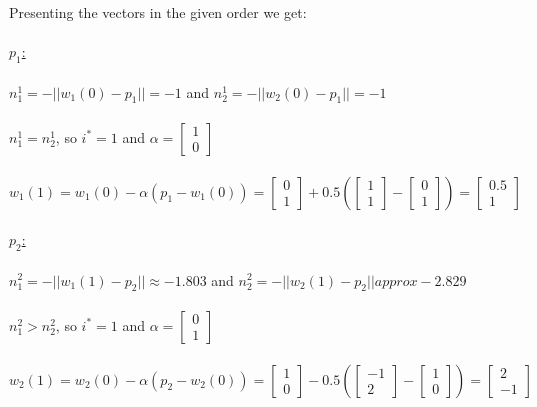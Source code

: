 \documentclass{article}
\begin{document}
\noindent Presenting the vectors in the given order we get: \\\\ \underline{$p_1$:} \\\\$n_1^1 = -||w_1(0)-p_1|| = -1$ and $n_2^1 = -||w_2(0)-p_1|| = -1$ \\\\
$n_1^1 = n_2^1$, so $i^{*} = 1$ and $\alpha = \begin{bmatrix}
  1\\ 
  0
\end{bmatrix}$ \\\\ $w_1(1)=w_1(0) - \alpha(p_1-w_1(0)) = \begin{bmatrix}
  0 \\
  1
\end{bmatrix} + 0.5 (\begin{bmatrix}
  1\\
  1
\end{bmatrix} - \begin{bmatrix}
  0\\
  1
\end{bmatrix}) =  \begin{bmatrix}
  0.5\\
  1
\end{bmatrix}$
\\\\ \underline{$p_2$:} \\\\$n_1^2 = -||w_1(1)-p_2|| \approx -1.803$ and $n_2^2 = -||w_2(1)-p_2|| approx -2.829$ \\\\
$n_1^2 > n_2^2$, so $i^{*} = 1$ and $\alpha = \begin{bmatrix}
  0\\ 
  1
\end{bmatrix}$ \\\\ $w_2(1)=w_2(0) - \alpha(p_2-w_2(0)) = \begin{bmatrix}
  1 \\
  0
\end{bmatrix} - 0.5 (\begin{bmatrix}
  -1\\
  2
\end{bmatrix} - \begin{bmatrix}
  1\\
  0
\end{bmatrix}) =  \begin{bmatrix}
  2\\
  -1
\end{bmatrix}$
\end{document}
